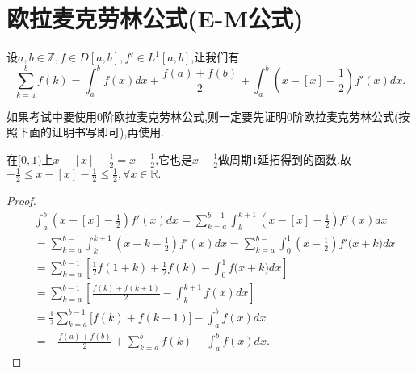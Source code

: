 \documentclass[lang=cn,newtx,10pt,scheme=chinese]{elegantbook}
\begin{document}
\section{欧拉麦克劳林公式(E-M公式)}

\begin{proposition}\label{proposition:0阶欧拉麦克劳林公式(0阶E-M公式)}
设\(a,b\in\mathbb{Z}, f\in D[a,b], f'\in L^1[a,b]\),让我们有
\[
\sum_{k = a}^{b}f(k)=\int_{a}^{b}f(x)dx+\frac{f(a)+f(b)}{2}+\int_{a}^{b}\left(x - [x]-\frac{1}{2}\right)f'(x)dx.
\]
\end{proposition}
\begin{remark}
   如果考试中要使用0阶欧拉麦克劳林公式,则一定要先证明0阶欧拉麦克劳林公式(按照下面的证明书写即可),再使用.
\end{remark}
\begin{note}
   在\([0,1)\)上\(x - [x]-\frac{1}{2}=x - \frac{1}{2}\),它也是\(x - \frac{1}{2}\)做周期\(1\)延拓得到的函数.故$-\frac{1}{2}\leqslant x-[x]-\frac{1}{2}\leqslant \frac{1}{2},\forall x\in \mathbb{R} .$
\end{note}
\begin{proof}
\begin{align*}
   &\int_a^b{\left( x-[x]-\frac{1}{2} \right) f'(x)dx}=\sum_{k=a}^{b-1}{\int_k^{k+1}{\left( x-[x]-\frac{1}{2} \right) f'(x)dx}}
\\
&=\sum_{k=a}^{b-1}{\int_k^{k+1}{\left( x-k-\frac{1}{2} \right) f'(x)dx}}=\sum_{k=a}^{b-1}{\int_0^1{\left( x-\frac{1}{2} \right) f'(x}}+k)dx
\\
&=\sum_{k=a}^{b-1}{\left[ \frac{1}{2}f(1+k)+\frac{1}{2}f(k)-\int_0^1{f(x}+k)dx \right]}
\\
&=\sum_{k=a}^{b-1}{\left[ \frac{f(k)+f(k+1)}{2}-\int_k^{k+1}{f(x)dx} \right]}
\\
&=\frac{1}{2}\sum_{k=a}^{b-1}{[f(k)}+f(k+1)]-\int_a^b{f(x)dx}
\\
&=-\frac{f(a)+f(b)}{2}+\sum_{k=a}^b{f(k)}-\int_a^b{f(x)dx}.
\end{align*}
\end{proof}
\end{document}
